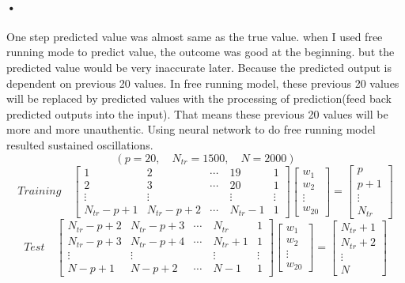 \documentclass{article}
\begin{document}
\paragraph{•}One step predicted value was almost same as the true value. when I used free running mode to predict value, the outcome was good at the beginning. but the predicted value would be very inaccurate later. Because the predicted output is dependent on previous 20 values. In free running model, these previous 20 values will be replaced by predicted values with the processing of prediction(feed back predicted outputs into the input). That means these previous 20 values will be more and more unauthentic. Using neural network to do free running model resulted sustained oscillations.
	$$(p=20,\quad N_{tr}=1500,\quad N=2000)$$
\bigskip 
 \[
 	\left. 
      Training\quad
    \right. 
	\left[ 
    \begin{array}{ccccc} 
    	1 & 2 & \cdots & 19 & 1 \\ 
        2 & 3 & \cdots & 20 & 1 \\
        \vdots & \vdots &\quad& \vdots & \vdots \\
        N_{tr}-p+1 & N_{tr}-p+2 & \cdots & N_{tr}-1 & 1 
    \end{array} 
    \right]
    \left[ 
    \begin{array}{c} 
    	w_{1} \\ 
        w_{2} \\
        \vdots \\
        w_{20} 
    \end{array} 
    \right]
    \left. 
      =
    \right. 
    \left[ 
    \begin{array}{c} 
    	p \\ 
        p+1 \\
        \vdots \\
        N_{tr} 
    \end{array} 
    \right]
 \]
 \bigskip 
 \[
 	\left. 
      Test\quad
    \right. 
	\left[ 
    \begin{array}{ccccc} 
    	N_{tr}-p+2 & N_{tr}-p+3 & \cdots & N_{tr} & 1 \\ 
        N_{tr}-p+3 & N_{tr}-p+4 & \cdots & N_{tr}+1 & 1 \\ 
        \vdots & \vdots &\quad& \vdots & \vdots \\
        N-p+1 & N-p+2 & \cdots & N-1 & 1 
    \end{array} 
    \right]
    \left[ 
    \begin{array}{c} 
    	w_{1} \\ 
        w_{2} \\
        \vdots \\
        w_{20} 
    \end{array} 
    \right]
    \left. 
      =
    \right. 
    \left[ 
    \begin{array}{c} 
    	N_{tr}+1 \\ 
        N_{tr}+2 \\
        \vdots \\
        N 
    \end{array} 
    \right]
 \]
\end{document}
